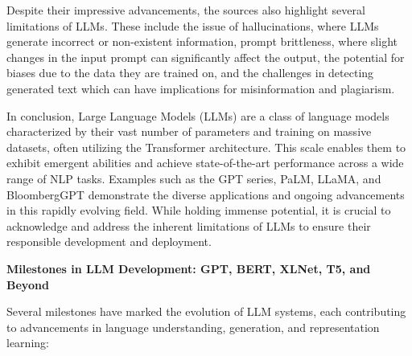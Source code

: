 Despite their impressive advancements, the sources also highlight several limitations of LLMs. These include the issue of hallucinations, where LLMs generate incorrect or non-existent information, prompt brittleness, where slight changes in the input prompt can significantly affect the output, the potential for biases due to the data they are trained on, and the challenges in detecting generated text which can have implications for misinformation and plagiarism.

In conclusion, Large Language Models (LLMs) are a class of language models characterized by their vast number of parameters and training on massive datasets, often utilizing the Transformer architecture. This scale enables them to exhibit emergent abilities and achieve state-of-the-art performance across a wide range of NLP tasks. Examples such as the GPT series, PaLM, LLaMA, and BloombergGPT demonstrate the diverse applications and ongoing advancements in this rapidly evolving field. While holding immense potential, it is crucial to acknowledge and address the inherent limitations of LLMs to ensure their responsible development and deployment.

\textbf{Milestones in LLM Development: GPT, BERT, XLNet, T5, and Beyond
}

Several milestones have marked the evolution of LLM systems, each contributing to
advancements in language understanding, generation, and representation learning:

